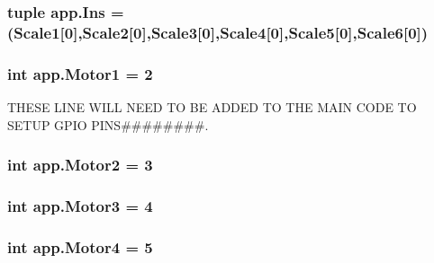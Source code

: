 \subsubsection[{\texorpdfstring{Ins}{Ins}}]{\setlength{\rightskip}{0pt plus 5cm}tuple app.\+Ins = ({\bf Scale1}\mbox{[}0\mbox{]},{\bf Scale2}\mbox{[}0\mbox{]},{\bf Scale3}\mbox{[}0\mbox{]},{\bf Scale4}\mbox{[}0\mbox{]},{\bf Scale5}\mbox{[}0\mbox{]},{\bf Scale6}\mbox{[}0\mbox{]})}\hypertarget{namespaceapp_a6e40c8db2a5b809f6f1a52bd20bd75f2}{}\label{namespaceapp_a6e40c8db2a5b809f6f1a52bd20bd75f2}
\subsubsection[{\texorpdfstring{Motor1}{Motor1}}]{\setlength{\rightskip}{0pt plus 5cm}int app.\+Motor1 = 2}\hypertarget{namespaceapp_a52e9545d13acb505f0dfe6a0f8a9ead5}{}\label{namespaceapp_a52e9545d13acb505f0dfe6a0f8a9ead5}


T\+H\+E\+SE L\+I\+NE W\+I\+LL N\+E\+ED TO BE A\+D\+D\+ED TO T\+HE M\+A\+IN C\+O\+DE TO S\+E\+T\+UP G\+P\+IO P\+I\+NS\#\#\#\#\#\#\#\#. 

\subsubsection[{\texorpdfstring{Motor2}{Motor2}}]{\setlength{\rightskip}{0pt plus 5cm}int app.\+Motor2 = 3}\hypertarget{namespaceapp_a2d3780102500a6c8338843256acb072e}{}\label{namespaceapp_a2d3780102500a6c8338843256acb072e}
\subsubsection[{\texorpdfstring{Motor3}{Motor3}}]{\setlength{\rightskip}{0pt plus 5cm}int app.\+Motor3 = 4}\hypertarget{namespaceapp_a9a249bef7b328713c5499a1ba8624b6c}{}\label{namespaceapp_a9a249bef7b328713c5499a1ba8624b6c}
\subsubsection[{\texorpdfstring{Motor4}{Motor4}}]{\setlength{\rightskip}{0pt plus 5cm}int app.\+Motor4 = 5}\hypertarget{namespaceapp_ae7f2a515528b9ae1ca2ef72c80b44bc0}{}\label{namespaceapp_ae7f2a515528b9ae1ca2ef72c80b44bc0}
